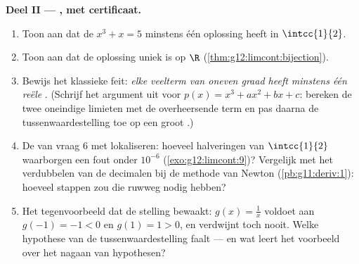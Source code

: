 \begin{problem}
\medskip
\noindent\textbf{Deel II --- , met certificaat.}
\begin{enumerate}[resume]
  \item Toon aan dat de  $x^3 + x = 5$ minstens één oplossing
        heeft in $\intcc{1}{2}$.
  \item Toon aan dat de oplossing uniek is op $\R$
        (\cref{thm:g12:limcont:bijection}).
  \item Bewijs het klassieke feit: \emph{elke veelterm van oneven graad heeft
        minstens één reële }. (Schrijf het argument uit voor
        $p(x) = x^3 + a x^2 + b x + c$: bereken de twee oneindige limieten met
        de overheersende term en pas daarna de tussenwaardestelling toe op een
        groot .)
  \item De  van vraag 6 met  lokaliseren: hoeveel halveringen
        van $\intcc{1}{2}$ waarborgen een fout onder $10^{-6}$
        (\cref{exo:g12:limcont:9})? Vergelijk met het verdubbelen van de
        decimalen bij de methode van Newton (\cref{pb:g11:deriv:1}): hoeveel
        stappen zou die ruwweg nodig hebben?
  \item Het tegenvoorbeeld dat de stelling bewaakt: $g(x) = \frac1x$ voldoet
        aan $g(-1) = -1 < 0$ en $g(1) = 1 > 0$, en verdwijnt toch nooit. Welke
        hypothese van de tussenwaardestelling faalt --- en wat leert het
        voorbeeld over het nagaan van hypothesen?
\end{enumerate}


\end{problem}
